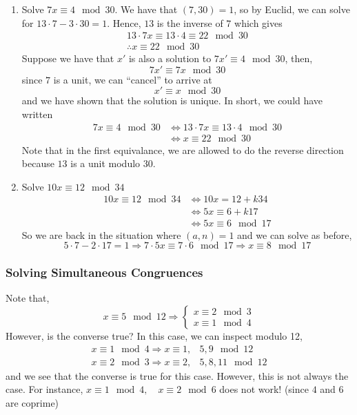 \documentclass{article}
\begin{document}
\begin{eg}\leavevmode
    \begin{enumerate}
        \item Solve $7x \equiv 4 \mod 30$. 
        We have that $(7, 30) = 1$, so by Euclid, we can solve for $13 \cdot 7 - 3 \cdot 30 = 1$. Hence, $13$ is the inverse of $7$ which gives
        \begin{align*}
            13 \cdot 7x \equiv 13 \cdot 4 \equiv 22 \mod 30 \\
            \therefore x \equiv 22 \mod 30
        \end{align*}
        Suppose we have that $x'$ is also a solution to $7x' \equiv 4 \mod 30$, then, 
        \[
            7x' \equiv 7x \mod 30  
        \]
        since $7$ is a unit, we can ``cancel'' to arrive at
        \[
            x' \equiv x \mod 30    
        \]
        and we have shown that the solution is unique. In short, we could have written
        \begin{align*}
            7x \equiv 4 \mod 30 &\Leftrightarrow 13 \cdot 7x \equiv 13 \cdot 4 \mod 30 \\
            &\Leftrightarrow x \equiv 22 \mod 30 
        \end{align*}
        Note that in the first equivalance, we are allowed to do the reverse direction because $13$ is a unit modulo $30$.

        \item Solve $10x \equiv 12 \mod 34$
        \begin{align*}
            10x \equiv 12 \mod 34 &\Leftrightarrow 10x = 12 + k34 \\
            &\Leftrightarrow 5x \equiv 6 + k17 \\
            &\Leftrightarrow 5x \equiv 6 \mod 17
        \end{align*}
        So we are back in the situation where $(a, n) = 1$ and we can solve as before,
        \[
            5\cdot7 - 2\cdot 17 = 1 \Rightarrow 7 \cdot 5x \equiv 7 \cdot 6 \mod 17 \Rightarrow x \equiv 8 \mod 17  
        \]
    \end{enumerate}
\end{eg}

\subsubsection*{Solving Simultaneous Congruences}
Note that,
\[
    x \equiv 5 \mod 12 \Rightarrow \begin{cases}
        x \equiv 2 \mod 3 \\
        x \equiv 1 \mod 4
    \end{cases}
\]
However, is the converse true? In this case, we can inspect modulo 12,
\begin{align*}
    x \equiv 1 \mod 4 \Rightarrow x \equiv 1, &5, 9 \mod 12 \\
    x \equiv 2 \mod 3 \Rightarrow x \equiv 2, &5, 8, 11 \mod 12
\end{align*}
and we see that the converse is true for this case. However, this is not always the case. For instance, $x \equiv 1 \mod 4, \quad x \equiv 2 \mod 6$ does not work! (since $4$ and $6$ are coprime)
\end{document}
